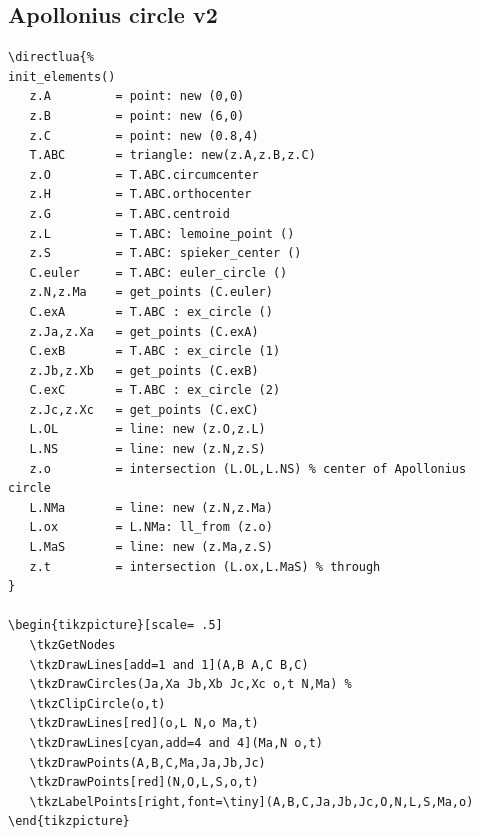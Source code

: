 \subsection{Apollonius circle v2} %
\label{sub:apollonius_circle_v2}
\begin{Verbatim}
\directlua{%
init_elements()
   z.A         = point: new (0,0)
   z.B         = point: new (6,0)
   z.C         = point: new (0.8,4)
   T.ABC       = triangle: new(z.A,z.B,z.C)
   z.O         = T.ABC.circumcenter
   z.H         = T.ABC.orthocenter
   z.G         = T.ABC.centroid
   z.L         = T.ABC: lemoine_point ()
   z.S         = T.ABC: spieker_center ()
   C.euler     = T.ABC: euler_circle ()
   z.N,z.Ma    = get_points (C.euler)
   C.exA       = T.ABC : ex_circle ()
   z.Ja,z.Xa   = get_points (C.exA)
   C.exB       = T.ABC : ex_circle (1)
   z.Jb,z.Xb   = get_points (C.exB)
   C.exC       = T.ABC : ex_circle (2)
   z.Jc,z.Xc   = get_points (C.exC)
   L.OL        = line: new (z.O,z.L)
   L.NS        = line: new (z.N,z.S)
   z.o         = intersection (L.OL,L.NS) % center of Apollonius circle
   L.NMa       = line: new (z.N,z.Ma)
   L.ox        = L.NMa: ll_from (z.o)
   L.MaS       = line: new (z.Ma,z.S)
   z.t         = intersection (L.ox,L.MaS) % through
}

\begin{tikzpicture}[scale= .5]
   \tkzGetNodes
   \tkzDrawLines[add=1 and 1](A,B A,C B,C)
   \tkzDrawCircles(Ja,Xa Jb,Xb Jc,Xc o,t N,Ma) %
   \tkzClipCircle(o,t)
   \tkzDrawLines[red](o,L N,o Ma,t)
   \tkzDrawLines[cyan,add=4 and 4](Ma,N o,t)
   \tkzDrawPoints(A,B,C,Ma,Ja,Jb,Jc)
   \tkzDrawPoints[red](N,O,L,S,o,t)
   \tkzLabelPoints[right,font=\tiny](A,B,C,Ja,Jb,Jc,O,N,L,S,Ma,o)
\end{tikzpicture}
\end{Verbatim}


